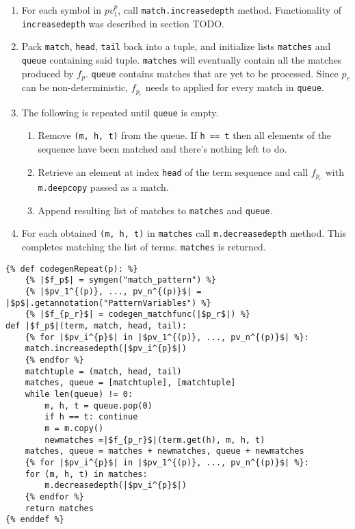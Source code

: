 \begin{enumerate}
\item
For each symbol in $pv_1^{p}$, call \texttt{match.increasedepth} method. Functionality of \texttt{increasedepth} was described in section TODO. 
\item
Pack \texttt{match}, \texttt{head}, \texttt{tail} back into a tuple, and initialize lists \texttt{matches} and \texttt{queue} containing said tuple. \texttt{matches} will eventually contain all the matches produced by $f_p$. \texttt{queue} contains matches that are yet to be processed. Since $p_r$ can be non-deterministic, $f_{p_r}$ needs to applied for every match in \texttt{queue}. 
\item The following is repeated until \texttt{queue} is empty. 
	\begin{enumerate}
	\item 
	Remove \texttt{(m, h, t)} from the queue. If \texttt{h == t} then all elements of the sequence have been matched and there's nothing left to do.  	
	\item
	Retrieve an element at index \texttt{head} of the term sequence and call $f_{p_r}$ with \texttt{m.deepcopy} passed as a match.
	\item Append resulting list of matches to \texttt{matches} and \texttt{queue}.
	\end{enumerate}

\item
For each obtained \texttt{(m, h, t)} in \texttt{matches} call \texttt{m.decreasedepth} method. This completes matching the list of terms. \texttt{matches} is returned.
\end{enumerate}

\begin{verbatim}
{% def codegenRepeat(p): %}
	{% |$f_p$| = symgen("match_pattern") %}
	{% |$pv_1^{(p)}, ..., pv_n^{(p)}$| = |$p$|.getannotation("PatternVariables") %}
	{% |$f_{p_r}$| = codegen_matchfunc(|$p_r$|) %}
def |$f_p$|(term, match, head, tail):
	{% for |$pv_i^{p}$| in |$pv_1^{(p)}, ..., pv_n^{(p)}$| %}:
	match.increasedepth(|$pv_i^{p}$|)
	{% endfor %}
	matchtuple = (match, head, tail)
	matches, queue = [matchtuple], [matchtuple]
	while len(queue) != 0:
		m, h, t = queue.pop(0)
		if h == t: continue
		m = m.copy()
		newmatches =|$f_{p_r}$|(term.get(h), m, h, t)
	matches, queue = matches + newmatches, queue + newmatches 
	{% for |$pv_i^{p}$| in |$pv_1^{(p)}, ..., pv_n^{(p)}$| %}:
	for (m, h, t) in matches: 
		m.decreasedepth(|$pv_i^{p}$|)
	{% endfor %}
	return matches
{% enddef %}
\end{verbatim}


